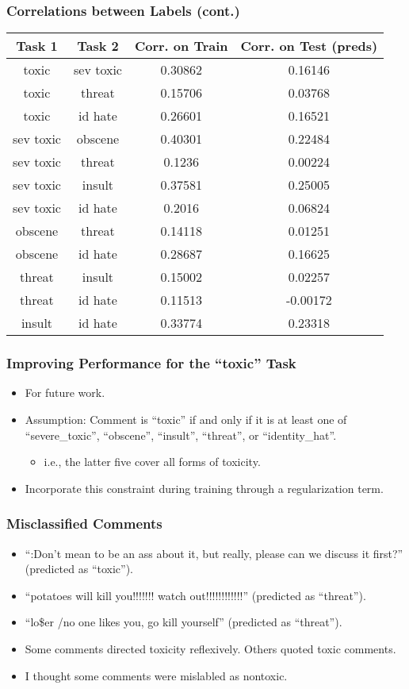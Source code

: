 \documentclass{beamer}
\begin{document}
\begin{frame}
\frametitle{Correlations between Labels (cont.)}
\begin{center}
\begin{tabular}{|c|c|c|c|} \hline
Task 1 & Task 2 & Corr. on Train & Corr. on Test (preds) \\ \hline
toxic & sev toxic & 0.30862 & 0.16146 \\
toxic & threat & 0.15706 & 0.03768 \\
toxic & id hate & 0.26601 & 0.16521 \\
sev toxic & obscene & 0.40301 & 0.22484 \\
sev toxic & threat & 0.1236 & 0.00224 \\
sev toxic & insult & 0.37581 & 0.25005 \\
sev toxic & id hate & 0.2016 & 0.06824 \\
obscene & threat & 0.14118 & 0.01251 \\
obscene & id hate & 0.28687 & 0.16625 \\
threat & insult & 0.15002 & 0.02257 \\
threat & id hate & 0.11513 & -0.00172 \\
insult & id hate & 0.33774 & 0.23318 \\
\hline
\end{tabular}
\end{center}
\end{frame}

\begin{frame}
\frametitle{Improving Performance for the ``toxic'' Task}
\begin{itemize}
\item For future work.
\item Assumption: Comment is ``toxic'' if and only if it is at least one of ``severe\_toxic'', ``obscene'', ``insult'', ``threat'', or ``identity\_hat''.
\begin{itemize}
\item i.e., the latter five cover all forms of toxicity.
\end{itemize}
\item Incorporate this constraint during training through a regularization term.
\end{itemize}
\end{frame}

\begin{frame}
\frametitle{Misclassified Comments}
\begin{itemize}
\item ``:Don't mean to be an ass about it, but really, please can we discuss it first?'' (predicted as ``toxic'').
\item ``potatoes will kill you!!!!!!! watch out!!!!!!!!!!!!'' (predicted as ``threat'').
\item ``lo\$er \slash no one likes you, go kill yourself'' (predicted as ``threat'').
\item Some comments directed toxicity reflexively. Others quoted toxic comments.
\item I thought some comments were mislabled as nontoxic.
\end{itemize}
\end{frame}
\end{document}
